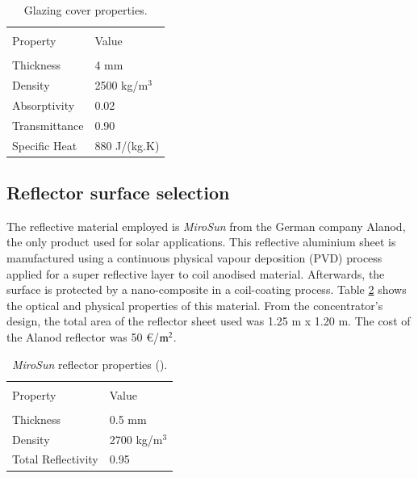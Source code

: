 \begin{table}[!ht]
	\caption{Glazing cover properties.}
	\centering
	\begin{tabular}{p{5cm}p{4cm}}
		\hline \\[-12pt] 
		Property & Value \\ 
		\hline \\[-12pt] 
		Thickness & 4 mm \\ [3pt]
		Density & 2500 kg/m$^3$ \\ [3pt]
		Absorptivity\footnotemark[1] & 0.02 \\ [3pt]
		Transmittance\footnotemark[1] & 0.90 \\ [3pt]
		Specific Heat & 880 J/(kg.K)  \\ [1pt]
		\hline 
	\end{tabular} 
	\label{glass_tempered}
\end{table}


\subsection{Reflector surface selection}

The reflective material employed is \textit{MiroSun} from the German company Alanod, the only product used for solar applications. This reflective aluminium sheet is manufactured using a continuous physical vapour deposition (PVD) process applied for a super reflective layer to coil anodised material. Afterwards, the surface is protected by a nano-composite in a coil-coating process. Table \ref{reflector_M} shows the optical and physical properties of this material. From the concentrator's design, the total area of the reflector sheet used was 1.25 m x 1.20 m. The cost of the Alanod reflector was 50 \euro/${\rm m^2}$.

\begin{table}[!ht]
	\caption{\textit{MiroSun} reflector properties (\cite{Alanod2016}).}
	\centering
	\begin{tabular}{p{5cm}p{4cm}}
		\hline \\[-12pt] 
		Property & Value \\ 
		\hline \\[-12pt] 
		Thickness & 0.5 mm \\ [3pt]
		Density & 2700 kg/m$^3$ \\ [3pt]
		Total Reflectivity & 0.95 \\ [1pt]
		\hline 
	\end{tabular} 
	\label{reflector_M}
\end{table}

